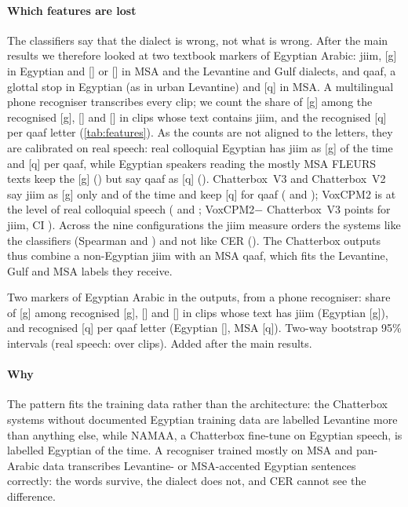\documentclass[11pt]{article}
\newcommand{\vox}{VoxCPM2\xspace}
\newcommand{\cbthree}{Chatterbox~V3\xspace}
\begin{document}
\paragraph{Which features are lost}
The classifiers say that the dialect is wrong, not what is wrong. After the main results we therefore looked at two
textbook markers of Egyptian Arabic: jiim, [g] in Egyptian and [] or [] in MSA and the Levantine
and Gulf dialects, and qaaf, a glottal stop in Egyptian (as in urban Levantine) and [q] in MSA. A multilingual phone
recogniser \citep{xu2022phoneme} transcribes every clip; we count the share of [g] among the recognised [g],
[] and [] in clips whose text contains jiim, and the recognised [q] per qaaf letter
(\cref{tab:features}). As the counts are not aligned to the letters, they are calibrated on real speech: real colloquial
Egyptian has jiim as [g]  of the time and  [q] per qaaf, while Egyptian
speakers reading the mostly MSA FLEURS texts keep the [g] () but say qaaf as [q]
(). \cbthree and Chatterbox~V2 say jiim as [g] only  and  of
the time and keep [q] for qaaf ( and ); \vox is at the level of real colloquial speech
( and ; \vox $-$ \cbthree {} points for jiim, CI
). Across the nine configurations the jiim measure orders the systems like the classifiers
(Spearman  and ) and not like CER (). The Chatterbox outputs thus combine a
non-Egyptian jiim with an MSA qaaf, which fits the Levantine, Gulf and MSA labels they receive.

\begin{table}[t]
\centering\small
\begin{adjustbox}{max width=\linewidth}
\end{adjustbox}
\caption{Two markers of Egyptian Arabic in the outputs, from a phone recogniser: share of [g] among recognised [g],
[] and [] in clips whose text has jiim (Egyptian [g]), and recognised [q] per qaaf letter
(Egyptian [], MSA [q]). Two-way bootstrap 95\% intervals (real speech: over clips). Added after the main
results.}
\label{tab:features}
\end{table}

\paragraph{Why}
The pattern fits the training data rather than the architecture: the Chatterbox systems without documented Egyptian
training data are labelled Levantine more than anything else, while NAMAA, a Chatterbox fine-tune on Egyptian speech, is
labelled Egyptian  of the time. A recogniser trained mostly on MSA and pan-Arabic data transcribes
Levantine- or MSA-accented Egyptian sentences correctly: the words survive, the dialect does not, and CER cannot see the
difference.
\end{document}
